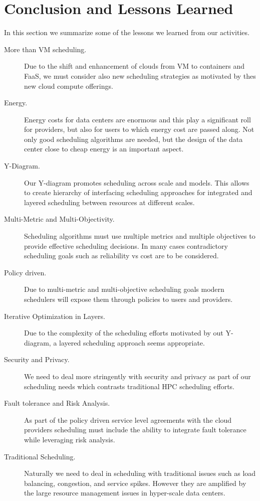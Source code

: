 \documentclass[final,5p,times,twocolumn]{elsarticle}
\begin{document}
\section{Conclusion and Lessons Learned}\label{sec:conclusion}



In this section we summarize some of the lessons we learned from our activities.

\begin{description}

\item[More than VM scheduling.] Due to the shift and enhancement of
clouds from VM to containers and FaaS, we must consider also new
scheduling strategies as motivated by thes new cloud compute
offerings.

\item[Energy.] Energy costs for data centers are enormous and this
play a significant roll for providers, but also for users to which
energy cost are passed along. Not only good scheduling algorithms are
needed, but the design of the data center close to cheap energy is an
important aspect.

\item[Y-Diagram.] Our Y-diagram promotes scheduling across scale and
models. This allows to create hierarchy of interfacing scheduling
approaches for integrated and layered scheduling between resources at
different scales.

\item[Multi-Metric and Multi-Objectivity.] Scheduling algorithms must
use multiple metrics and multiple objectives to provide effective
scheduling decisions. In many cases contradictory scheduling goals
such as reliability vs cost are to be considered.

\item[Policy driven.] Due to multi-metric and multi-objective
scheduling goals modern schedulers will expose them through policies
to users and providers.


\item[Iterative Optimization in Layers.] Due to the complexity of the
scheduling efforts motivated by out Y-diagram, a layered scheduling
approach seems appropriate.


\item[Security and Privacy.]  We need to deal more stringently with
security and privacy as part of our scheduling needs which contrasts
traditional HPC scheduling efforts.

\item[Fault tolerance and Risk Analysis.] As part of the policy driven
service level agreements with the cloud providers scheduling must
include the ability to integrate fault tolerance while leveraging risk
analysis.

\item[Traditional Scheduling.] Naturally we need to deal in scheduling
with traditional issues such as load balancing, congestion, and
service spikes. However they are amplified by the large resource
management issues in hyper-scale data centers.



\end{description}
\end{document}
